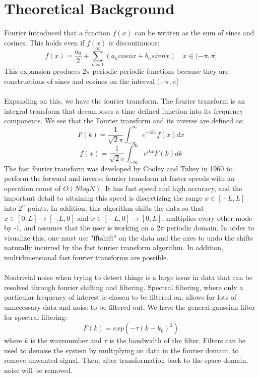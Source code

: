 \documentclass{article}
\begin{document}
\section*{\fontsize{19}{15}\selectfont Theoretical Background}
	Fourier introduced that a function $f(x)$ can be written as the sum of sines and cosines. This holds even if $f(x)$ is discontinuous: 
	\begin{equation} \label{eq:1}
		f(x) = \frac{a_0}{2} + \sum_{n=1}^{\infty}(a_ncosnx + b_nsinnx) \quad x\in(-\pi,\pi]
	\end{equation}
	This expansion produces $2\pi$ periodic periodic functions because they are constructions of sines and cosines on the interval $(-\pi, \pi]$ \\ \\
	Expanding on this, we have the fourier transform. The fourier transform is an integral transform that decomposes a time defined function into its frequency components. We see that the Fourier transform and its inverse are defined as: \\
	\begin{equation} \label{eq:2a}
		F(k) = \frac{1}{\sqrt2\pi} \int_{-\infty}^{\infty} e^{-ikx} f(x) dx
	\end{equation}
		\begin{equation} \label{eq:2b}
		f(x) = \frac{1}{\sqrt2\pi} \int_{-\infty}^{\infty} e^{ikx} F(k) dk
	\end{equation}
	The fast fourier transform was developed by Cooley and Tukey in 1960 to perform the forward and inverse fourier transform at faster speeds with an operation count of $O(NlogN)$. It has fast speed and high accuracy, and the important detail to attaining this speed is discretizing the range $x \in [-L,L]$ into $2^n$ points. In addition, this algorithm shifts the data so that $x\in [0,L] \rightarrow [-L,0]$ and $x\in [-L,0] \rightarrow [0, L]$, multiplies every other mode by -1, and assumes that the user is working on a $2\pi$ periodic domain. In order to visualize this, one must  use "fftshift" on the data and the axes to undo the shifts naturally incurred by the fast fourier transform algorithm. In addition, multidimensional fast fourier transforms are possible.\\ \\
	Nontrivial noise when trying to detect things is a large issue in data that can be resolved through fourier shifting and filtering. Spectral filtering, where only a particular frequency of interest is chosen to be filtered on, allows for lots of unnecessary data and noise to be filtered out. We have the general gaussian filter for spectral filtering: 
	\begin{equation} \label{eq:3}
	F(k) = exp(-\tau (k-k_0)^2)
	\end{equation}
	where $k$ is the wavenumber and $\tau$ is the bandwidth of the filter. Filters can be used to denoise the system by multiplying on data in the fourier domain, to remove unwanted signal. Then, after transformation back to the space domain, noise will be removed.
\end{document}
